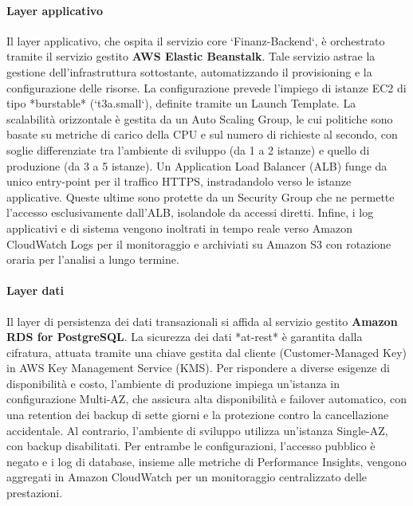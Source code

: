 \paragraph{Layer applicativo}
Il layer applicativo, che ospita il servizio core `Finanz-Backend`, è orchestrato tramite il servizio gestito \textbf{AWS Elastic Beanstalk}. Tale servizio astrae la gestione dell'infrastruttura sottostante, automatizzando il provisioning e la configurazione delle risorse. La configurazione prevede l'impiego di istanze EC2 di tipo *burstable* (`t3a.small`), definite tramite un Launch Template. La scalabilità orizzontale è gestita da un Auto Scaling Group, le cui politiche sono basate su metriche di carico della CPU e sul numero di richieste al secondo, con soglie differenziate tra l'ambiente di sviluppo (da 1 a 2 istanze) e quello di produzione (da 3 a 5 istanze). Un Application Load Balancer (ALB) funge da unico entry-point per il traffico HTTPS, instradandolo verso le istanze applicative. Queste ultime sono protette da un Security Group che ne permette l'accesso esclusivamente dall'ALB, isolandole da accessi diretti. Infine, i log applicativi e di sistema vengono inoltrati in tempo reale verso Amazon CloudWatch Logs per il monitoraggio e archiviati su Amazon S3 con rotazione oraria per l'analisi a lungo termine.

\paragraph{Layer dati}
Il layer di persistenza dei dati transazionali si affida al servizio gestito \textbf{Amazon RDS for PostgreSQL}. La sicurezza dei dati *at-rest* è garantita dalla cifratura, attuata tramite una chiave gestita dal cliente (Customer-Managed Key) in AWS Key Management Service (KMS). Per rispondere a diverse esigenze di disponibilità e costo, l'ambiente di produzione impiega un'istanza in configurazione Multi-AZ, che assicura alta disponibilità e failover automatico, con una retention dei backup di sette giorni e la protezione contro la cancellazione accidentale. Al contrario, l'ambiente di sviluppo utilizza un'istanza Single-AZ, con backup disabilitati. Per entrambe le configurazioni, l'accesso pubblico è negato e i log di database, insieme alle metriche di Performance Insights, vengono aggregati in Amazon CloudWatch per un monitoraggio centralizzato delle prestazioni.

